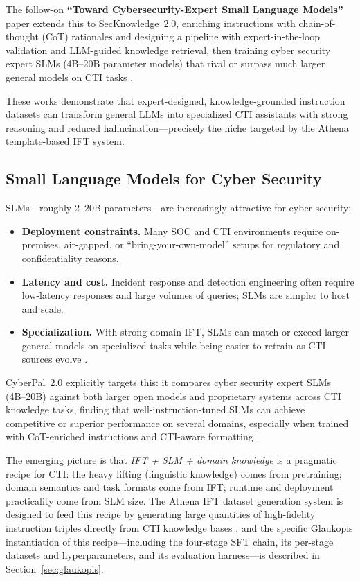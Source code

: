 \documentclass[unnumsec,webpdf,contemporary,large]{oup-authoring-template}
\theoremstyle{thmstyleone}
\theoremstyle{thmstyletwo}
\theoremstyle{thmstylethree}
\begin{document}
The follow-on \textbf{``Toward Cybersecurity-Expert Small Language Models''} paper extends this to SecKnowledge~2.0, enriching instructions with chain-of-thought (CoT) rationales and designing a pipeline with expert-in-the-loop validation and LLM-guided knowledge retrieval, then training cyber security expert SLMs (4B--20B parameter models) that rival or surpass much larger general models on CTI tasks \cite{levi2025toward}.

These works demonstrate that expert-designed, knowledge-grounded instruction datasets can transform general LLMs into specialized CTI assistants with strong reasoning and reduced hallucination---precisely the niche targeted by the Athena template-based IFT system.

\subsection{Small Language Models for Cyber Security}

SLMs---roughly 2--20B parameters---are increasingly attractive for cyber security:

\begin{itemize}
  \item \textbf{Deployment constraints.} Many SOC and CTI environments require on-premises, air-gapped, or ``bring-your-own-model'' setups for regulatory and confidentiality reasons.
  \item \textbf{Latency and cost.} Incident response and detection engineering often require low-latency responses and large volumes of queries; SLMs are simpler to host and scale.
  \item \textbf{Specialization.} With strong domain IFT, SLMs can match or exceed larger general models on specialized tasks while being easier to retrain as CTI sources evolve \cite{levi2025toward}.
\end{itemize}

CyberPal~2.0 explicitly targets this: it compares cyber security expert SLMs (4B--20B) against both larger open models and proprietary systems across CTI knowledge tasks, finding that well-instruction-tuned SLMs can achieve competitive or superior performance on several domains, especially when trained with CoT-enriched instructions and CTI-aware formatting \cite{levi2025toward}.

The emerging picture is that \emph{IFT + SLM + domain knowledge} is a pragmatic recipe for CTI: the heavy lifting (linguistic knowledge) comes from pretraining; domain semantics and task formats come from IFT; runtime and deployment practicality come from SLM size. The Athena IFT dataset generation system is designed to feed this recipe by generating large quantities of high-fidelity instruction triples directly from CTI knowledge bases \cite{cardei2025ift}, and the specific Glaukopis instantiation of this recipe---including the four-stage SFT chain, its per-stage datasets and hyperparameters, and its evaluation harness---is described in Section~\ref{sec:glaukopis}.
\end{document}

